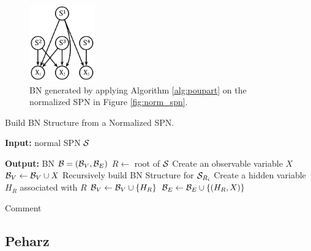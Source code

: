 \begin{figure}[h]
    \begin{center}
		\includegraphics[width=0.25\textwidth]{figures/bn_poupart.png}
		\caption{BN generated by applying Algorithm \ref{alg:poupart} on the normalized SPN in Figure \ref{fig:norm_spn}.}
	\label{fig:bn_poupart}
    \end{center}
\end{figure}

\begin{algorithm}[!ht]
    \caption{\cite{zhao2015relationship} Build BN Structure from a Normalized SPN.}
    \label{alg:poupart}
    \begin{algorithmic}[1]
        \item[\textbf{Input:} normal SPN $\cal S$]
        \item[\textbf{Output:} BN ${\cal B} = ({\cal B}_V, {\cal B}_E)$]
		\State $R \leftarrow$ root of ${\cal S}$
			\State Create an observable variable $X$
			\State ${\cal B}_V \leftarrow {\cal B}_V \cup X$
		\Else
					\State Recursively build BN Structure for ${\cal S}_{R_i}$
				\EndIf
			\EndFor
				\State Create a hidden variable $H_R$ associated with $R$
				\State ${\cal B}_V \leftarrow {\cal B}_V \cup \{H_R\}$
					\State ${\cal B}_E \leftarrow {\cal B}_E \cup \{(H_R,X)\}$
				\EndFor
			\EndIf
		\EndIf		
    \end{algorithmic}
\end{algorithm}

Comment

\subsection{Peharz}

